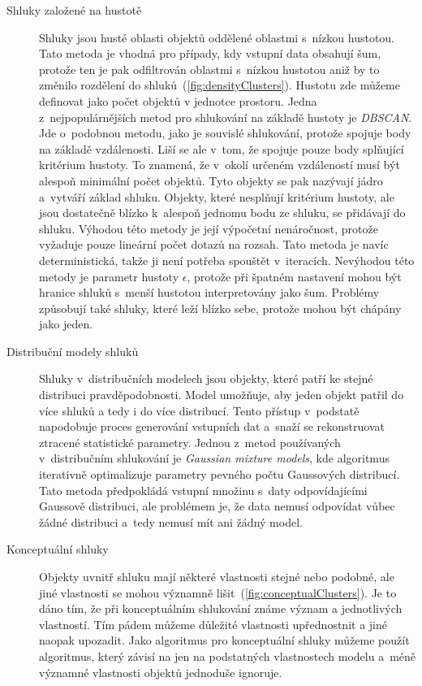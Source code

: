 \begin{description}
\item[Shluky založené na hustotě] Shluky jsou husté oblasti objektů oddělené oblastmi s~nízkou hustotou. Tato metoda je vhodná pro případy, kdy vstupní data obsahují šum, protože ten je pak odfiltrován oblastmi s~nízkou hustotou aniž by to změnilo rozdělení do shluků~(\autoref{fig:densityClusters}). Hustotu zde můžeme definovat jako počet objektů v jednotce prostoru.
Jedna z~nejpopulárnějších metod pro shlukování na základě hustoty je \textit{DBSCAN}. Jde o~podobnou metodu, jako je souvislé shlukování, protože spojuje body na základě vzdálenosti. Liší se ale v~tom, že spojuje pouze body splňující kritérium hustoty. To znamená, že v~okolí určeném vzdáleností musí být alespoň minimální počet objektů. Tyto objekty se pak nazývají jádro a~vytváří základ shluku. Objekty, které nesplňují kritérium hustoty, ale jsou dostatečně blízko k~alespoň jednomu bodu ze shluku, se přidávají do shluku.
Výhodou této metody je její výpočetní nenáročnost, protože vyžaduje pouze lineární počet dotazů na rozsah. Tato metoda je navíc deterministická, takže ji není potřeba spouštět v~iteracích.
Nevýhodou této metody je parametr hustoty $\epsilon$, protože při špatném nastavení mohou být hranice shluků s~menší hustotou interpretovány jako šum. Problémy způsobují také shluky, které leží blízko sebe, protože mohou být chápány jako jeden.

\item[Distribuční modely shluků] Shluky v~distribučních modelech jsou objekty, kte\-ré patří ke stejné distribuci pravděpodobnosti. Model umožňuje, aby jeden objekt patřil do více shluků a tedy i do více distribucí.
Tento přístup v~podstatě napodobuje proces generování vstupních dat a~sna\-ží se rekonstruovat ztracené statistické parametry. %
Jednou z~metod používaných v~distribučním shlukování je \textit {Gaussian mixture models}, kde algoritmus iterativně optimalizuje parametry pevného počtu Gaussových distribucí.
Tato metoda předpokládá vstupní množinu s~daty odpovídajícími Gaussově distribuci, ale problémem je, že data nemusí od\-po\-ví\-dat vůbec žádné distribuci a~tedy nemusí mít ani žádný model.

\item[Konceptuální shluky] Objekty uvnitř shluku mají některé vlastnosti stejné nebo podobné, ale jiné vlastnosti se mohou významně lišit~(\autoref{fig:conceptualClusters}). Je to dáno tím, že při konceptuálním shlukování známe význam a jednotlivých vlastností. Tím pádem můžeme důležité vlastnosti upřednostnit a jiné naopak upozadit.
Jako algoritmus pro konceptuální shluky můžeme použít algoritmus, který závisí na jen na podstatných vlastnostech modelu a~méně významné vlastnosti objektů jednoduše ignoruje.


\end{description}
